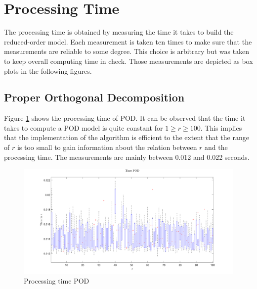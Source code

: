 \section{Processing Time}
The processing time is obtained by measuring the time it takes to build the reduced-order model.
Each measurement is taken ten times to make sure that the measurements are reliable to some degree.
This choice is arbitrary but was taken to keep overall computing time in check.
Those measurements are depicted as box plots in the following figures.

\subsection{Proper Orthogonal Decomposition}
Figure \ref{FIG-T-POD} shows the processing time of POD.
It can be observed that the time it takes to compute a POD model is quite constant for  \(1 \geq r \geq 100\).
This implies that the implementation of the algorithm is efficient to the extent that the range of \(r\) is too small to gain information about the relation between \(r\) and the processing time.
The measurements are mainly between 0.012 and 0.022 seconds.
\begin{figure}[H]
\centering
\includegraphics[width=\textwidth]{images/time/POD}
\caption{Processing time POD}
\label{FIG-T-POD}
\end{figure}



